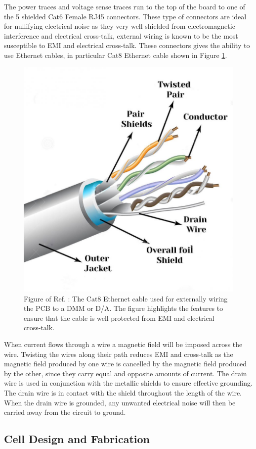 \documentclass[12pt,MEng]{UoAThesis}
\begin{document}
The power traces and voltage sense traces run to the top of the board to one of the 5 shielded Cat6 Female RJ45 connectors. These type of connectors are ideal for nullifying electrical noise as they very well shielded from electromagnetic interference and electrical cross-talk, external wiring is known to be the most susceptible to EMI and electrical cross-talk. These connectors gives the ability to use Ethernet cables, in particular Cat8 Ethernet cable shown in Figure \ref{fig:cat}.

 \begin{figure}[htp]
  \centering
  \includegraphics[clip,width=0.4\linewidth]{figures/cat}
  \caption{\label{fig:cat} Figure of Ref. \cite{cat8}: The Cat8 Ethernet cable used for externally wiring the PCB to a DMM or D/A. The figure highlights the features to ensure that the cable is well protected from EMI and electrical cross-talk.}
\end{figure}

\noindent When current flows through a wire a magnetic field will be imposed across the wire. Twisting the wires along their path reduces EMI and cross-talk as the magnetic field produced by one wire is cancelled by the magnetic field produced by the other, since they carry equal and opposite amounts of current. The drain wire is used in conjunction with the metallic shields to ensure effective grounding. The drain wire is in contact with the shield throughout the length of the wire. When the drain wire is grounded, any unwanted electrical noise will then be carried away from the circuit to ground.

\subsection{Cell Design and Fabrication}
\end{document}
